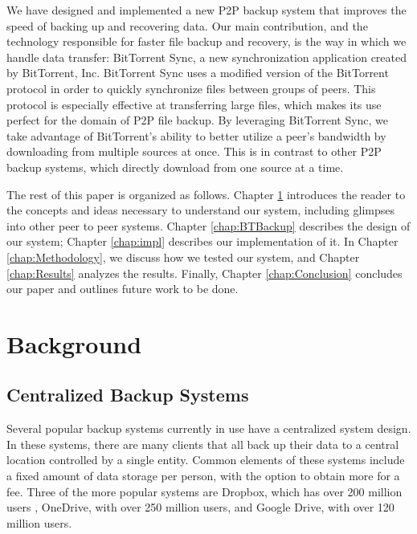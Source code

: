 \documentclass[12pt]{report}
\begin{document}

We have designed and implemented a new P2P backup system that improves the speed of backing up and recovering data. Our main contribution, and the technology responsible for faster file backup and recovery, is the way in which we handle data transfer: BitTorrent Sync, a new synchronization application created by BitTorrent, Inc. BitTorrent Sync uses a modified version of the BitTorrent protocol in order to quickly synchronize files between groups of peers. This protocol is especially effective at transferring large files, which makes its use perfect for the domain of P2P file backup. By leveraging BitTorrent Sync, we take advantage of BitTorrent's ability to better utilize a peer's bandwidth by downloading from multiple sources at once. This is in contrast to other P2P backup systems, which directly download from one source at a time.



The rest of this paper is organized as follows. Chapter \ref{chap:Background} introduces the reader to the concepts and ideas necessary to understand our system, including glimpses into other peer to peer systems. Chapter \ref{chap:BTBackup} describes the design of our system; Chapter \ref{chap:impl} describes our implementation of it. In Chapter \ref{chap:Methodology}, we discuss how we tested our system, and Chapter \ref{chap:Results} analyzes the results. Finally, Chapter \ref{chap:Conclusion} concludes our paper and outlines future work to be done.

\chapter{Background} \label{chap:Background}
\section{Centralized Backup Systems}
Several popular backup systems currently in use have a centralized system design. In these systems, there are many clients that all back up their data to a central location controlled by a single entity. Common elements of these systems include a fixed amount of data storage per person, with the option to obtain more for a fee. Three of the more popular systems are Dropbox, which has over 200 million users \cite{dropboxusers}, OneDrive, with over 250 million users, and Google Drive, with over 120 million users.
\end{document}
